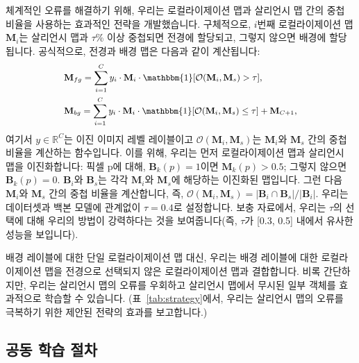\documentclass[final]{cvpr}
\begin{document}
체계적인 오류를 해결하기 위해, 우리는 로컬라이제이션 맵과 살리언시 맵 간의 중첩 비율을 사용하는 효과적인 전략을 개발했습니다. 구체적으로, $i$번째 로컬라이제이션 맵 $\mathbf{M}_{i}$는 살리언시 맵과 $\tau$\% 이상 중첩되면 전경에 할당되고, 그렇지 않으면 배경에 할당됩니다. 공식적으로, 전경과 배경 맵은 다음과 같이 계산됩니다: \vspace{-1mm}
\begin{equation}
\label{eq_map_selection}
{\small
\begin{split}
&\mathbf{M}_{fg} = \sum_{i=1}^{C} {y_{i} \cdot \mathbf{M}_{i} \cdot \mathbbm{1}[\mathcal{O}(\mathbf{M}_i, \mathbf{M}_{s}) > \tau]}, \\
&\mathbf{M}_{bg} = \sum_{i=1}^{C} {y_{i} \cdot \mathbf{M}_{i} \cdot \mathbbm{1}[\mathcal{O}(\mathbf{M}_i, \mathbf{M}_{s}) \le \tau]} + \mathbf{M}_{C+1},
\end{split}}\vspace{-1mm}
\end{equation}
\noindent 여기서 $y \in \mathbb{R}^C$는 이진 이미지 레벨 레이블이고 $\mathcal{O}(\mathbf{M}_i, \mathbf{M}_{s})$는 $\mathbf{M}_i$와 $\mathbf{M}_{s}$ 간의 중첩 비율을 계산하는 함수입니다. 이를 위해, 우리는 먼저 로컬라이제이션 맵과 살리언시 맵을 이진화합니다: 픽셀 p에 대해, $\mathbf{B}_{k}(p) = 1$이면 $\mathbf{M}_{k}(p) > 0.5$; 그렇지 않으면 $\mathbf{B}_{k}(p) = 0$. $\mathbf{B}_{i}$와 $\mathbf{B}_{s}$는 각각 $\mathbf{M}_i$와 $\mathbf{M}_{s}$에 해당하는 이진화된 맵입니다. 그런 다음 $\mathbf{M}_i$와 $\mathbf{M}_{s}$ 간의 중첩 비율을 계산합니다, 즉, $\mathcal{O}(\mathbf{M}_i ,\mathbf{M}_{s}) = |\mathbf{B}_i \cap \mathbf{B}_{s}| / |\mathbf{B}_{i}|$. 우리는 데이터셋과 백본 모델에 관계없이 $\tau=0.4$로 설정합니다. 보충 자료에서, 우리는 $\tau$의 선택에 대해 우리의 방법이 강력하다는 것을 보여줍니다(즉, $\tau$가 [0.3, 0.5] 내에서 유사한 성능을 보입니다).

배경 레이블에 대한 단일 로컬라이제이션 맵 대신, 우리는 배경 레이블에 대한 로컬라이제이션 맵을 전경으로 선택되지 않은 로컬라이제이션 맵과 결합합니다. 비록 간단하지만, 우리는 살리언시 맵의 오류를 우회하고 살리언시 맵에서 무시된 일부 객체를 효과적으로 학습할 수 있습니다. (표~\ref{tab:strategy}에서, 우리는 살리언시 맵의 오류를 극복하기 위한 제안된 전략의 효과를 보고합니다.)

\subsection{공동 학습 절차}\label{section3.3}
\end{document}
